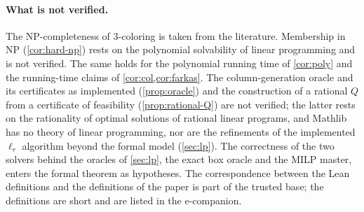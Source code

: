 \paragraph{What is not verified.} The NP-completeness of 3-coloring is taken from the literature. Membership in NP (\cref{cor:hard-np}) rests on the polynomial solvability of linear programming and is not verified. The same holds for the polynomial running time of \cref{cor:poly} and the running-time claims of \cref{cor:col,cor:farkas}. The column-generation oracle and its certificates as implemented (\cref{prop:oracle}) and the construction of a rational $Q$ from a certificate of feasibility (\cref{prop:rational-Q}) are not verified; the latter rests on the rationality of optimal solutions of rational linear programs, and Mathlib has no theory of linear programming, nor are the refinements of the implemented $\ell_r$ algorithm beyond the formal model (\cref{sec:lp}). The correctness of the two solvers behind the oracles of \cref{sec:lp}, the exact box oracle and the MILP master, enters the formal theorem as hypotheses. The correspondence between the Lean definitions and the definitions of the paper is part of the trusted base; the definitions are short and are listed in the e-companion.
